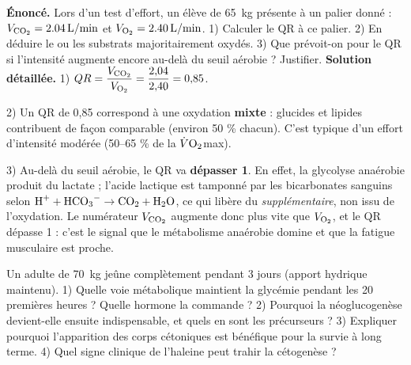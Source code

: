 \documentclass[11pt]{article}
\begin{document}
\begin{exoresolu}
\textbf{Énoncé.} Lors d'un test d'effort, un élève de \SI{65}{kg} présente à un palier donné : $V_{\ce{CO2}} = \SI{2,04}{L/min}$ et $V_{\ce{O2}} = \SI{2,40}{L/min}$. 1) Calculer le QR à ce palier. 2) En déduire le ou les substrats majoritairement oxydés. 3) Que prévoit-on pour le QR si l'intensité augmente encore au-delà du seuil aérobie ? Justifier.
\tcblower
\textbf{Solution détaillée.}
1) $QR = \dfrac{V_{\ce{CO2}}}{V_{\ce{O2}}} = \dfrac{2{,}04}{2{,}40} = 0{,}85$.

2) Un QR de 0,85 correspond à une oxydation \textbf{mixte} : glucides et lipides contribuent de façon comparable (environ 50 \% chacun). C'est typique d'un effort d'intensité modérée (50--65 \% de la $\dot{V}\ce{O2}$max).

3) Au-delà du seuil aérobie, le QR va \textbf{dépasser 1}. En effet, la glycolyse anaérobie produit du lactate ; l'acide lactique est tamponné par les bicarbonates sanguins selon $\ce{H+} + \ce{HCO3-} \rightarrow \ce{CO2} + \ce{H2O}$, ce qui libère du  \emph{supplémentaire}, non issu de l'oxydation. Le numérateur $V_{\ce{CO2}}$ augmente donc plus vite que $V_{\ce{O2}}$, et le QR dépasse 1 : c'est le signal que le métabolisme anaérobie domine et que la fatigue musculaire est proche.
\end{exoresolu}

\begin{exercice}
Un adulte de \SI{70}{kg} jeûne complètement pendant 3 jours (apport hydrique maintenu). 1) Quelle voie métabolique maintient la glycémie pendant les 20 premières heures ? Quelle hormone la commande ? 2) Pourquoi la néoglucogenèse devient-elle ensuite indispensable, et quels en sont les précurseurs ? 3) Expliquer pourquoi l'apparition des corps cétoniques est bénéfique pour la survie à long terme. 4) Quel signe clinique de l'haleine peut trahir la cétogenèse ?
\end{exercice}
\end{document}
